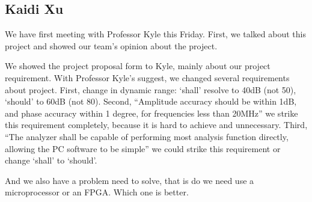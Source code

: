 \documentclass{article}
\begin{document}
\subsection*{Kaidi Xu}

We have first meeting with Professor Kyle this Friday.  First, we talked about
this project and showed our team’s opinion about the project.

We showed the project proposal form to Kyle, mainly about our project
requirement. With Professor Kyle’s suggest, we changed several requirements
about project. First, change in dynamic range: `shall' resolve to 40dB (not
50), `should' to 60dB (not 80).  Second, ``Amplitude accuracy should be within
1dB, and phase accuracy within 1 degree, for frequencies less than 20MHz'' we
strike this requirement completely, because it is hard to achieve and
unnecessary. Third, ``The analyzer shall be capable of performing most analysis
function directly, allowing the PC software to be simple'' we could strike this
requirement or change `shall' to `should'.

And we also have a problem need to solve, that is do we need use a
microprocessor or an FPGA. Which one is better.
\end{document}
